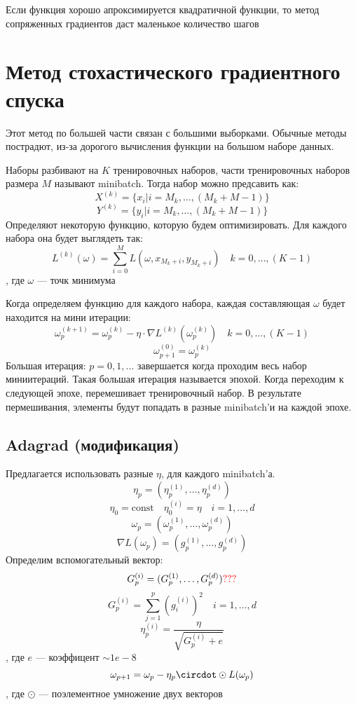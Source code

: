 \documentclass[oneside]{book}
\newcommand{\const}{\text{const}}
\theoremstyle{plain}
\theoremstyle{remark}
\theoremstyle{definition}
\begin{document}
Если функция хорошо апроксимируется квадратичной функции, то метод сопряженных градиентов даст маленькое количество шагов
\section{Метод стохастического градиентного спуска}
\label{sec:orgd71bcc0}
Этот метод по большей части связан с большими выборками. Обычные методы пострадют, из-за дорогого вычисления функции на большом наборе данных.

Наборы разбивают на \(K\) тренировочных наборов, части тренировочных наборов размера \(M\) называют minibatch. Тогда набор можно предсавить как:
\[ X^{(k)} = \{x_i | i = M_k,\dots,(M_k + M - 1)\} \]
\[ Y^{(k)} = \{y_i | i = M_k,\dots,(M_k + M - 1)\} \]
Определяют некоторую функцию, которую будем оптимизировать. Для каждого набора она будет выглядеть так:
\[ L^{(k)}(\omega) = \sum_{i = 0}^M L(\omega, x_{M_k + i}, y_{M_k + i}) \quad k = 0,\dots,(K - 1)\]
, где \(\omega\) --- точк минимума

Когда определяем функцию для каждого набора, каждая составляющая \(\omega\) будет находится на мини итерации:
\[ \omega_p^{(k + 1)} = \omega_p^{(k)} - \eta \cdot \nabla L^{(k)}(\omega_p^{(k)}) \quad k = 0,\dots,(K - 1)\]
\[ \omega^{(0)}_{p + 1} = \omega^{(k)}_p \]
Большая итерация: \(p = 0,1,\dots\) завершается когда проходим весь набор миниитераций. Такая большая итерация называется эпохой. Когда переходим к следующей эпохе, перемешивает тренировочный набор. В результате пермешивания, элементы будут попадать в разные minibatch'и на каждой эпохе.

\subsection{Adagrad (модификация)}
\label{sec:org6f97ffa}
Предлагается использовать разные \(\eta\), для каждого minibatch'а.
\[ \eta_p = (\eta^{(1)}_p,\dots,\eta_p^{(d)}) \]
\[ \eta_0 = \const \quad \eta^{(i)}_0 = \eta \quad i = 1,\dots,d\]
\[ \omega_p = (\omega^{(1)}_p,\dots,\omega^{(d)}_p) \]
\[ \nabla L(\omega_p) = (g^{(1)}_p,\dots,g^{(d)}_p) \]
Определим вспомогательный вектор:
\[ G^{(i)}_p = (G^{(1)}_p,\dots,G^{(d)}_p) \color{red}???\color{black} \]
\[ G^{(i)}_p = \sum_{j = 1}^p (g_i^{(i)})^2 \quad i = 1,\dots,d\]
\[ \eta_p^{(i)} = \frac{\eta}{\sqrt{G^{(i)}_p + e}} \]
, где \(e\) --- коэффицент \(\sim 1e-8\)
\[ \omega_{p + 1} = \omega_p - \eta_p \circdot \odot L(\omega_p) \], где \(\odot\) --- поэлементное умножение двух векторов
\end{document}
